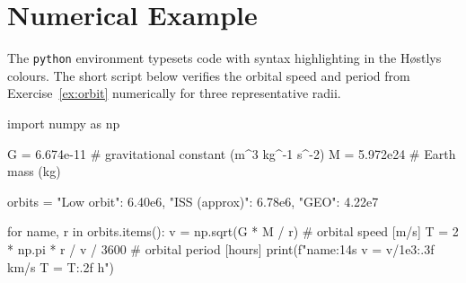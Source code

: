 \documentclass[11pt]{article}
\begin{document}
\section{Numerical Example}

The \verb|python| environment typesets code with syntax highlighting in the Høstlys colours. The short script below verifies the orbital speed and period from Exercise~\ref{ex:orbit} numerically for three representative radii.

\begin{python}
import numpy as np

G = 6.674e-11   # gravitational constant  (m^3 kg^-1 s^-2)
M = 5.972e24    # Earth mass              (kg)

orbits = {"Low orbit":    6.40e6,
          "ISS (approx)": 6.78e6,
          "GEO":          4.22e7}

for name, r in orbits.items():
    v = np.sqrt(G * M / r)           # orbital speed  [m/s]
    T = 2 * np.pi * r / v / 3600    # orbital period [hours]
    print(f"{name:14s}  v = {v/1e3:.3f} km/s   T = {T:.2f} h")
\end{python}
\end{document}
